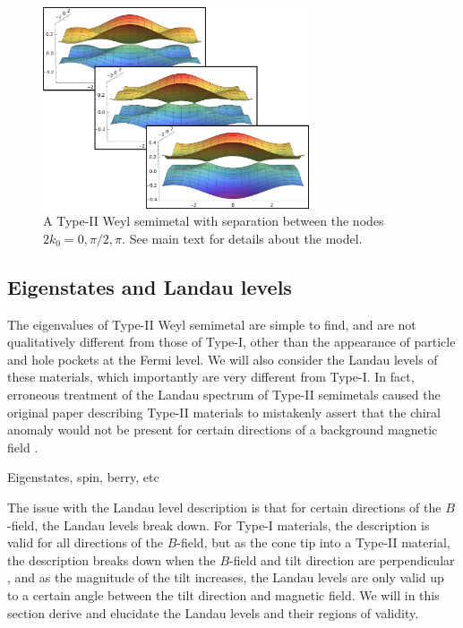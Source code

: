 \begin{figure}[ht]
  \centering
  \includegraphics[width=0.7\textwidth]{figures/movetypeiinode}
  \caption{\label{fig:typeii:move-nodes} A Type-II Weyl semimetal with separation between the nodes \(2k_{0} = 0, \pi/2, \pi \).
    See main text for details about the model.}
\end{figure}


\subsection{Eigenstates and Landau levels}
The eigenvalues of Type-II Weyl semimetal are simple to find, and are not qualitatively different from those of Type-I, other than the appearance of particle and hole pockets at the Fermi level.
We will also consider the Landau levels of these materials, which importantly are very different from Type-I.
In fact, erroneous treatment of the Landau spectrum of Type-II semimetals caused the original paper describing Type-II materials to mistakenly assert that the chiral anomaly would not be present for certain directions of a background magnetic field \cite{soluyanovTypeIIWeylSemimetals2015}\cite{sharmaChiralAnomalyLongitudinal2017}.

Eigenstates, spin, berry, etc

The issue with the Landau level description is that for certain directions of the \(B\)-field, the Landau levels break down.
For Type-I materials, the description is valid for all directions of the \(B\)-field, but as the cone tip into a Type-II material, the description breaks down when the \(B\)-field and tilt direction are perpendicular \cite{sharmaChiralAnomalyLongitudinal2017}, and as the magnitude of the tilt increases, the Landau levels are only valid up to a certain angle between the tilt direction and magnetic field.
We will in this section derive and elucidate the Landau levels and their regions of validity.

